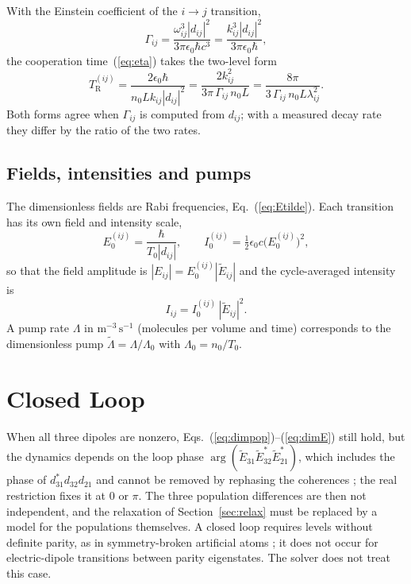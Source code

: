 \documentclass[12pt,a4paper]{article}
\newcommand{\T}{T_0}
\newcommand{\tE}{\tilde{E}}
\newcommand{\TR}[1]{T_{\mathrm{R}}^{(#1)}}
\begin{document}
With the Einstein coefficient of the $i\rightarrow j$ transition,
\begin{equation}
  \Gamma_{ij} = \frac{\omega_{ij}^3 |d_{ij}|^2}{3\pi\epsilon_0\hbar c^3}
  = \frac{k_{ij}^3 |d_{ij}|^2}{3\pi\epsilon_0\hbar},
\end{equation}
the cooperation time~(\ref{eq:eta}) takes the two-level form
\begin{equation}
  \TR{ij} = \frac{2\epsilon_0\hbar}{n_0 L k_{ij} |d_{ij}|^2}
     = \frac{2 k_{ij}^2}{3\pi\,\Gamma_{ij}\, n_0 L}
     = \frac{8\pi}{3\,\Gamma_{ij}\, n_0 L \lambda_{ij}^2}.
\end{equation}
Both forms agree when $\Gamma_{ij}$ is computed from $d_{ij}$; with a
measured decay rate they differ by the ratio of the two rates.

\subsection{Fields, intensities and pumps}

The dimensionless fields are Rabi frequencies, Eq.~(\ref{eq:Etilde}). Each
transition has its own field and intensity scale,
\begin{equation}
  E_0^{(ij)} = \frac{\hbar}{\T |d_{ij}|}, \qquad
  I_0^{(ij)} = \tfrac12\epsilon_0 c \bigl(E_0^{(ij)}\bigr)^2,
\end{equation}
so that the field amplitude is $|E_{ij}| = E_0^{(ij)}|\tE_{ij}|$ and the
cycle-averaged intensity is
\begin{equation}
  I_{ij} = I_0^{(ij)}\,|\tE_{ij}|^2 .
\end{equation}
A pump rate $\Lambda$ in $\mathrm{m^{-3}\,s^{-1}}$ (molecules per volume and
time) corresponds to the dimensionless pump $\tilde{\Lambda} = \Lambda/\Lambda_0$
with $\Lambda_0 = n_0/\T$.

\section{Closed Loop}
\label{sec:loop}

When all three dipoles are nonzero, Eqs.~(\ref{eq:dimpop})--(\ref{eq:dimE})
still hold, but the dynamics depends on the loop phase
$\arg(\tE_{31}\tE_{32}^*\tE_{21}^*)$, which includes the phase of
$d_{31}^*d_{32}d_{21}$ and cannot be removed by rephasing the coherences
\cite{Kosachiov1992}; the real restriction fixes it at $0$ or $\pi$. The
three population differences are then not independent, and the relaxation of
Section~\ref{sec:relax} must be replaced by a model for the populations
themselves. A closed loop requires levels without definite parity, as in
symmetry-broken artificial atoms \cite{Liu2005}; it does not occur for
electric-dipole transitions between parity eigenstates. The solver does not
treat this case.
\end{document}

